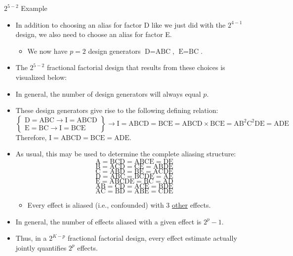 \begin{Example}{$ 2^{5-2} $ Example}{}
    \begin{itemize}
        \item In addition to choosing an alias for factor D like we just did with the $ 2^{4-1} $ design, we also need to choose an alias for factor E.
              \begin{itemize}[label={}]
                  \item We now have $ p=2 $ design generators $ \text{D}=\text{ABC} $, $ \text{E}=\text{BC} $.
              \end{itemize}
    \end{itemize}
    \begin{itemize}[*]
        \item The $ 2^{5-2} $ fractional factorial design that results from these choices is visualized below:
        \item In general, the number of design generators will always equal $ p $.
    \end{itemize}
    \begin{itemize}
        \item These design generators give rise to the following defining relation:
              \[ \begin{Bmatrix}
                      \text{D}=\text{ABC}\rightarrow \text{I}=\text{ABCD} \\
                      \text{E}=\text{BC}\rightarrow \text{I}=\text{BCE}
                  \end{Bmatrix}\rightarrow
                  \text{I}=\text{ABCD}=\text{BCE}=\text{ABCD}\times\text{BCE}=\text{A}\text{B}^2\text{C}^2\text{DE}=\text{ADE} \]
              Therefore, $ \text{I}=\text{ABCD}=\text{BCE}=\text{ADE} $.
        \item As usual, this may be used to determine the complete aliasing structure:
              \[ \text{A}=\text{BCD}=\text{ABCE}=\text{DE} \]
              \[ \text{B}=\text{ACD}=\text{CE}=\text{ABDE} \]
              \[ \text{C}=\text{ABD}=\text{BE}=\text{ACDE} \]
              \[ \text{D}=\text{ABC}=\text{BCDE}=\text{AE} \]
              \[ \text{E}=\text{ABCDE}=\text{BC}=\text{AD} \]
              \[ \text{AB}=\text{CD}=\text{ACE}=\text{BDE} \]
              \[ \text{AC}=\text{BD}=\text{ABE}=\text{CDE} \]
              \begin{itemize}[*]
                  \item Every effect is aliased (i.e., confounded) with 3 \underline{other} effects.
              \end{itemize}
    \end{itemize}
    \begin{itemize}[*]
        \item In general, the number of effects aliased with a given effect is $ 2^{p}-1 $.
        \item Thus, in a $ 2^{K-p} $ fractional factorial design, every effect estimate actually jointly quantifies $2^p$ effects.
    \end{itemize}
\end{Example}
